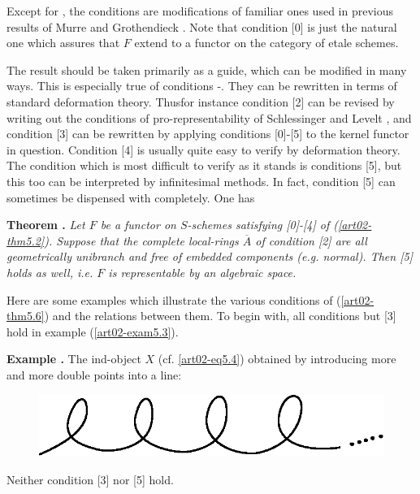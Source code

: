 Except for \cite{art02-key4}, the conditions are modifications of familiar ones used in previous results of Murre \cite{art02-key27} and Grothendieck \cite{art02-key28}. Note that condition [0] is just the natural one which assures that $F$ extend to a functor on the category of etale schemes.

The result should be taken primarily as a guide, which can be modified in many ways. This is especially true of conditions \cite{art02-key2}-\cite{art02-key5}. They can be rewritten in terms of standard deformation theory. Thus\pageoriginale for instance condition [2] can be revised by writing out the conditions of pro-representability of Schlessinger \cite{art02-key32} and Levelt \cite{art02-key21}, and condition [3] can be rewritten by applying conditions [0]-[5] to the kernel functor in question. Condition [4] is usually quite easy to verify by deformation theory. The condition which is most difficult to verify as it stands is conditions [5], but this too can be interpreted by infinitesimal methods. In fact, condition [5] can sometimes be dispensed with completely. One has

\medskip
\noindent
{\bf Theorem .\label{art02-thm5.7}}
{\em Let $F$ be a functor on $S$-schemes satisfying [0]-[4] of (\ref{art02-thm5.2}). Suppose that the complete local-rings $\overline{A}$ of condition [2] are all geometrically unibranch and free of embedded components (e.g. normal). Then [5] holds as well, i.e. $F$ is representable by an algebraic space.}
\smallskip

Here are some examples which illustrate the various conditions of (\ref{art02-thm5.6}) and the relations between them. To begin with, all conditions but [3] hold in example (\ref{art02-exam5.3}).

\medskip
\noindent
{\bf Example .\label{art02-exam5.8}}
The ind-object $X$ (cf. \eqref{art02-eq5.4}) obtained by introducing more and more double points into a line:
\begin{figure}[H]
\centering
\includegraphics{src/chap2/fig2.eps}
\end{figure}
Neither condition [3] nor [5] hold.

